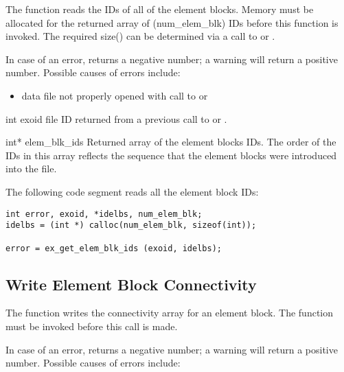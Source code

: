 The function  reads the IDs of all of
the element blocks. Memory must be allocated for the returned array of
({num_elem_blk}) IDs before this function is invoked. The required
size() can be determined via a call to
 or .


In case of an error,  returns
a negative number; a warning will return a positive number.
Possible causes of errors include:

\begin{itemize}
 \item data file not properly opened with call to 
 or 
\end{itemize}


\begin{parameters}
\item[{int exoid \R{}}]
\exo{} file ID returned from a previous call to 
or .

\item[{int* elem_blk_ids \W{}}]
Returned array of the element blocks IDs. The order of the IDs in this
array reflects the sequence that the element blocks were introduced
into the file.
\end{parameters}

The following code segment reads all the element block IDs:

\begin{lstlisting}
int error, exoid, *idelbs, num_elem_blk;
idelbs = (int *) calloc(num_elem_blk, sizeof(int));

error = ex_get_elem_blk_ids (exoid, idelbs);
\end{lstlisting}

\subsection{Write Element Block Connectivity}

The function  writes the connectivity array
for an element block. The function  must
be invoked before this call is made.


In case of an error,  returns a
negative number; a warning will return a positive number.
Possible causes of errors include:

